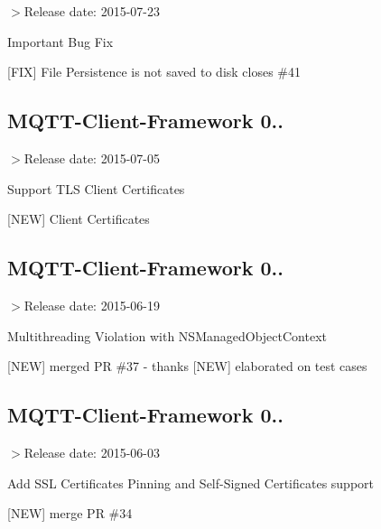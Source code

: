 $>$Release date\+: 2015-\/07-\/23

Important Bug Fix

\mbox{[}F\+IX\mbox{]} File Persistence is not saved to disk closes \#41

\subsection*{M\+Q\+T\+T-\/\+Client-\/\+Framework 0..}

$>$Release date\+: 2015-\/07-\/05

Support T\+LS Client Certificates

\mbox{[}N\+EW\mbox{]} Client Certificates

\subsection*{M\+Q\+T\+T-\/\+Client-\/\+Framework 0..}

$>$Release date\+: 2015-\/06-\/19

Multithreading Violation with N\+S\+Managed\+Object\+Context

\mbox{[}N\+EW\mbox{]} merged PR \#37 -\/ thanks \mbox{[}N\+EW\mbox{]} elaborated on test cases

\subsection*{M\+Q\+T\+T-\/\+Client-\/\+Framework 0..}

$>$Release date\+: 2015-\/06-\/03

Add S\+SL Certificates Pinning and Self-\/\+Signed Certificates support

\mbox{[}N\+EW\mbox{]} merge PR \#34 
